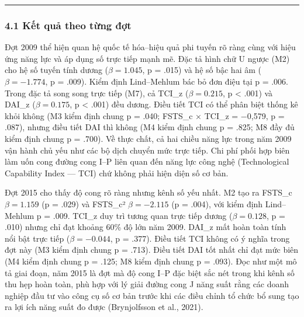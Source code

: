 \documentclass[12pt,a4paper]{article}
\begin{document}
\begin{center}\rule{0.5\linewidth}{0.5pt}\end{center}

\hypertarget{41-kux1ebft-quux1ea3-theo-tux1eebng-ux111ux1ee3t}{%
\subsubsection{4.1 Kết quả theo từng
đợt}\label{41-kux1ebft-quux1ea3-theo-tux1eebng-ux111ux1ee3t}}

Đợt 2009 thể hiện quan hệ quốc tế hóa--hiệu quả phi tuyến rõ ràng cùng
với hiệu ứng năng lực và áp dụng số trực tiếp mạnh mẽ. Đặc tả hình chữ U
ngược (M2) cho hệ số tuyến tính dương (\(\beta = 1.045\), p = .015) và
hệ số bậc hai âm (\(\beta = −1.774\), p = .009). Kiểm định Lind--Mehlum
bác bỏ đơn điệu tại p = .006. Trong đặc tả song song trực tiếp (M7), cả
TCI\_z (\(\beta = 0.215\), p \textless{} .001) và DAI\_z
(\(\beta = 0.175\), p \textless{} .001) đều dương. Điều tiết TCI có thể
phân biệt thống kê khỏi không (M3 kiểm định chung p = .040; FSTS\_c ×
TCI\_z = −0,579, p = .087), nhưng điều tiết DAI thì không (M4 kiểm định
chung p = .825; M8 đầy đủ kiểm định chung p = .700). Về thực chất, cả
hai chiều năng lực trong năm 2009 vận hành chủ yếu như các bộ dịch
chuyển mức trực tiếp. Chi phí phối hợp biên làm uốn cong đường cong I--P
liên quan đến năng lực công nghệ (Technological Capability Index ---
TCI) chứ không phải hiện diện số cơ bản.

Đợt 2015 cho thấy độ cong rõ ràng nhưng kênh số yếu nhất. M2 tạo ra
FSTS\_c \(\beta = 1.159\) (p = .029) và FSTS\_c² \(\beta = −2.115\) (p =
.004), với kiểm định Lind--Mehlum p = .009. TCI\_z duy trì tương quan
trực tiếp dương (\(\beta = 0.128\), p = .010) nhưng chỉ đạt khoảng 60\%
độ lớn năm 2009. DAI\_z mất hoàn toàn tính nổi bật trực tiếp
(\(\beta = −0.044\), p = .377). Điều tiết TCI không có ý nghĩa trong đợt
này (M3 kiểm định chung p = .713). Điều tiết DAI tốt nhất chỉ đạt mức
biên (M4 kiểm định chung p = .125; M8 kiểm định chung p = .093). Đọc như
một mô tả giai đoạn, năm 2015 là đợt mà độ cong I--P đặc biệt sắc nét
trong khi kênh số thu hẹp hoàn toàn, phù hợp với lý giải đường cong J
năng suất rằng các doanh nghiệp đầu tư vào công cụ số cơ bản trước khi
các điều chỉnh tổ chức bổ sung tạo ra lợi ích năng suất đo được
(Brynjolfsson et al., 2021).
\end{document}

